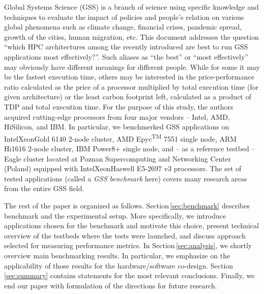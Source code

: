 Global Systems Science (GSS) is a branch of science using specific knowledge and techniques to evaluate the impact of policies and people's relation on various global phenomena such as climate change, financial crises, pandemic spread, growth of the cities, human migration, etc. This document addresses the question ``which HPC architectures among the recently introduced are best to run GSS applications most effectively?''. Such aliases as ``the best'' or ``most effectively'' may obviously have different meanings for different people. While for some it may be the fastest execution time, others may be interested in the price-performance ratio calculated as the price of a processor multiplied by total execution time (for given architecture) or the least carbon footprint left, calculated as a product of TDP and total execution time.
For the purpose of this study, the authors acquired cutting-edge processors from four major vendors -- Intel, AMD, HiSilicon, and IBM. In particular, we benchmerked GSS applications on Intel\textregistered Xeon\textregistered Gold 6140 \cite{INTELXEONGOLD6140} 2-node cluster, AMD Epyc\textsuperscript{TM} 7551 single node, ARM Hi1616 2-node cluster, IBM Power8+ \cite{IBMPOWER8} single node, and -- as a reference testbed -- Eagle cluster located at Poznan Supercomputing and Networking Center (Poland) equipped with Intel\textregistered  Xeon\textregistered Haswell E5-2697 v3 processors.
The set of tested applications (called a \textit{GSS benchmark} here) covers many research areas from the entire GSS field.

The rest of the paper is organized as follows.
Section\,\ref{sec:benchmark} describes benchmark and the experimental setup.
More specifically, we introduce applications chosen for the benchmark and motivate this choice,
present technical overview of the testbeds where the tests were launched,
and discuss approach selected for measuring performance metrics.
In Section\,\ref{sec:analysis}, we shortly overview main benchmarking results.
In particular, we emphasize on the applicability of those results for the hardware/software co-design.
Section\,\ref{sec:summary} contains statements for the most relevant conclusions.
Finally, we end our paper with formulation of the directions for future research.
